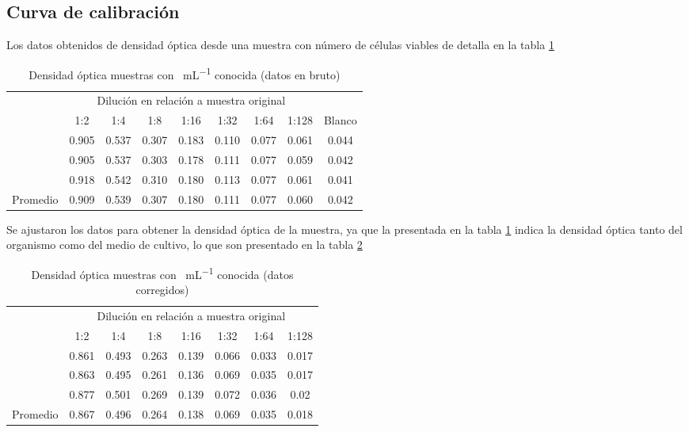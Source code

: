 \subsection{Curva de calibración}

Los datos obtenidos de densidad óptica desde una muestra con número de células viables de detalla en la tabla \ref{tab:cal_brut}

\begin{table}[H]
  \centering
  \begin{tabular}{ccccccccc}\toprule
    & \multicolumn{7}{c}{Dilución en relación a muestra original} & \\ \cmidrule{2-8}
    & 1:2 & 1:4 & 1:8 & 1:16 & 1:32 & 1:64 & 1:128 & Blanco \\ \cmidrule{2-9}
    & 0.905 & 0.537 & 0.307 & 0.183 & 0.110 & 0.077 & 0.061 & 0.044 \\
    & 0.905 & 0.537 & 0.303 & 0.178 & 0.111 & 0.077 & 0.059 & 0.042 \\
    & 0.918 & 0.542 & 0.310 & 0.180 & 0.113 & 0.077 & 0.061 & 0.041 \\ \midrule
    Promedio & 0.909 & 0.539 & 0.307 & 0.180 & 0.111 & 0.077 & 0.060 & 0.042 \\ \bottomrule
  \end{tabular}
  \caption{Densidad óptica muestras con \si{\ufc\per\mL} conocida (datos en bruto)}
  \label{tab:cal_brut}
\end{table}


Se ajustaron los datos para obtener la densidad óptica de la muestra, ya que la presentada en la tabla \ref{tab:cal_brut} indica la densidad óptica tanto del organismo como del medio de cultivo, lo que son presentado en la tabla \ref{tab:cal_adj}

\begin{table}[H]
  \centering
  \begin{tabular}{cccccccc}\toprule
    & \multicolumn{7}{c}{Dilución en relación a muestra original} \\ \cmidrule{2-8}
    & 1:2 & 1:4 & 1:8 & 1:16 & 1:32 & 1:64 & 1:128 \\ \cmidrule{2-8}
    & 0.861 & 0.493 & 0.263 & 0.139 & 0.066 & 0.033 & 0.017 \\
    & 0.863 & 0.495 & 0.261 & 0.136 & 0.069 & 0.035 & 0.017 \\
    & 0.877 & 0.501 & 0.269 & 0.139 & 0.072 & 0.036 & 0.02 \\ \midrule
    Promedio & 0.867 & 0.496 & 0.264 & 0.138 & 0.069 & 0.035 & 0.018 \\ \bottomrule
  \end{tabular}
  \caption{Densidad óptica muestras con \si{\ufc\per\mL} conocida (datos corregidos)}
  \label{tab:cal_adj}
\end{table}

